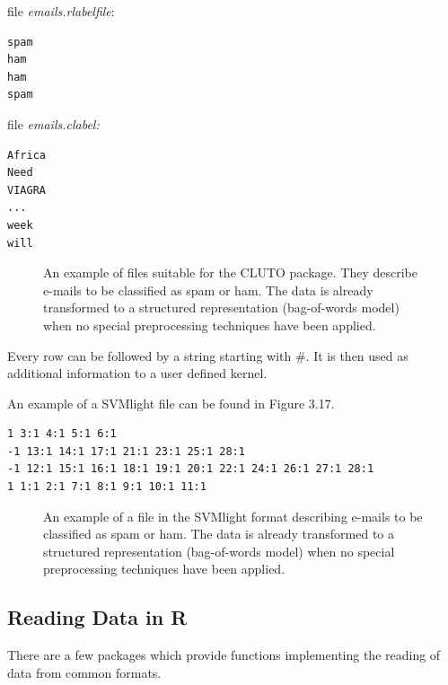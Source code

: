 \begin{center}
file \textit{emails.rlabelfile}:
\end{center}

\begin{verbatim}
spam
ham
ham
spam
\end{verbatim}

\begin{center}
file \textit{emails.clabel:}
\end{center}

\begin{verbatim}
Africa
Need
VIAGRA
...
week
will
\end{verbatim}

\begin{figure}[H]
    \centering
    \caption{An example of files suitable for the CLUTO package. They describe e-mails to
be classified as spam or ham. The data is already transformed to a structured representation
(bag-of-words model) when no special preprocessing techniques have been applied.}
    \label{fig:placeholder316}
\end{figure}

Every row can be followed by a string starting with \#. It is then used as
additional information to a user defined kernel.

An example of a SVMlight file can be found in Figure 3.17.

\begin{verbatim}
1 3:1 4:1 5:1 6:1
-1 13:1 14:1 17:1 21:1 23:1 25:1 28:1
-1 12:1 15:1 16:1 18:1 19:1 20:1 22:1 24:1 26:1 27:1 28:1
1 1:1 2:1 7:1 8:1 9:1 10:1 11:1
\end{verbatim}

\begin{figure}[H]
    \centering
    \caption{An example of a file in the SVMlight format describing e-mails to be classified
as spam or ham. The data is already transformed to a structured representation (bag-of-words
model) when no special preprocessing techniques have been applied.}
    \label{fig:placeholder317}
\end{figure}

\subsection{Reading Data in R}

There are a few packages which provide functions implementing the reading of
data from common formats.

